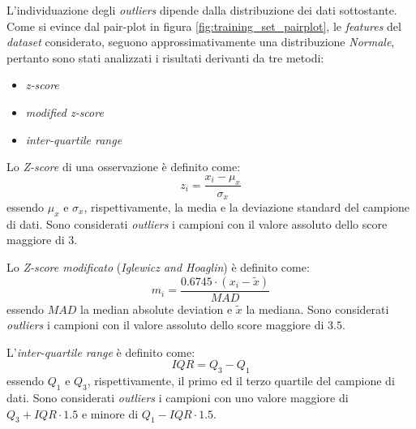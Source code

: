                         L'individuazione degli \textit{outliers} dipende dalla distribuzione dei dati sottostante. Come si evince dal pair-plot in figura \ref{fig:training_set_pairplot}, le \textit{features} del \textit{dataset} considerato, seguono approssimativamente una distribuzione \textit{Normale}, pertanto sono stati analizzati i risultati derivanti da tre metodi:
                        \begin{itemize}
                            \item \textit{z-score}
                            \item \textit{modified z-score}
                            \item \textit{inter-quartile range}
                        \end{itemize}
                    
                        Lo \textit{Z-score} di una osservazione è definito come:
                        \begin{displaymath}
                                z_i = \frac{x_i - \mu_x}{\sigma_x}
                        \end{displaymath}
                        essendo $\mu_x$ e $\sigma_x$, rispettivamente, la media e la deviazione standard del campione di dati. Sono considerati \textit{outliers} i campioni con il valore assoluto dello score maggiore di $3$.
                        \smallbreak
                        
                        Lo \textit{Z-score modificato} (\textit{Iglewicz and Hoaglin}) è definito come:
                        \begin{displaymath}
                                m_i = \frac{0.6745 \cdot (x_i - \tilde{x})}{MAD}
                        \end{displaymath}
                        essendo $MAD$ la median absolute deviation e $\tilde{x}$ la mediana. Sono considerati \textit{outliers} i campioni con il valore assoluto dello score maggiore di $3.5$.
                        \smallbreak
                        
                        L'\textit{inter-quartile range} è definito come:
                        \begin{displaymath}
                                IQR = Q_3 - Q_1
                        \end{displaymath}
                        essendo $Q_1$ e $Q_3$, rispettivamente, il primo ed il terzo quartile del campione di dati. Sono considerati \textit{outliers} i campioni con uno valore maggiore di $Q_3 + IQR \cdot 1.5$ e minore di $Q_1 - IQR \cdot 1.5$.
                        \bigbreak
                        
